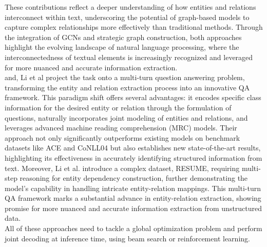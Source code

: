 These contributions reflect a deeper understanding of how entities and relations interconnect within text, underscoring the potential of graph-based models to capture complex relationships more effectively than traditional methods. Through the integration of GCNs and strategic graph construction, both approaches highlight the evolving landscape of natural language processing, where the interconnectedness of textual elements is increasingly recognized and leveraged for more nuanced and accurate information extraction.\\

and, Li et al\cite{li-etal-2019-entity} project the task onto a multi-turn question answering problem, transforming the entity and relation extraction process into an innovative QA framework. This paradigm shift offers several advantages: it encodes specific class information for the desired entity or relation through the formulation of questions, naturally incorporates joint modeling of entities and relations, and leverages advanced machine reading comprehension (MRC) models. Their approach not only significantly outperforms existing models on benchmark datasets like ACE and CoNLL04 but also establishes new state-of-the-art results, highlighting its effectiveness in accurately identifying structured information from text. Moreover, Li et al. introduce a complex dataset, RESUME, requiring multi-step reasoning for entity dependency construction, further demonstrating the model's capability in handling intricate entity-relation mappings. This multi-turn QA framework marks a substantial advance in entity-relation extraction, showing promise for more nuanced and accurate information extraction from unstructured data.\\
All of these approaches need to tackle a global optimization problem and perform joint decoding at inference time, using beam search or reinforcement learning.

